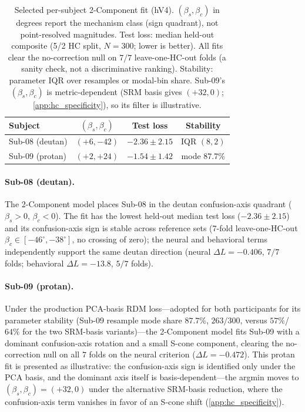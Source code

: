 \documentclass{article}
\begin{document}
\begin{table}[t]
  \caption{Selected per-subject 2-Component fit (hV4). $(\beta_s, \beta_c)$ in degrees report the mechanism class (sign quadrant), not point-resolved magnitudes. Test loss: median held-out composite (5/2 HC split, $N{=}300$; lower is better). All fits clear the no-correction null on $7/7$ leave-one-HC-out folds (a sanity check, not a discriminative ranking). Stability: parameter IQR over resamples or modal-bin share. Sub-09's $(\beta_s, \beta_c)$ is metric-dependent (SRM basis gives $(+32, 0)$; \cref{app:hc_specificity}), so its filter is illustrative.}
  \label{tab:main}
  \begin{center}
    \begin{small}
      \begin{tabular}{lccc}
        \toprule
        Subject & $(\beta_s, \beta_c)$ & Test loss & Stability \\
        \midrule
        Sub-08 (deutan) & $(+6, -42)$ & $-2.36 \pm 2.15$ & IQR $(8,2)$ \\
        Sub-09 (protan) & $(+2, +24)$ & $-1.54 \pm 1.42$ & mode $87.7\%$ \\
        \bottomrule
      \end{tabular}
    \end{small}
  \end{center}
  \vskip -0.15in
\end{table}

\paragraph{Sub-08 (deutan).}
The 2-Component model places Sub-08 in the deutan confusion-axis quadrant ($\beta_s > 0$, $\beta_c < 0$).
The fit has the lowest held-out median test loss ($-2.36 \pm 2.15$) and its confusion-axis sign is stable across reference sets (7-fold leave-one-HC-out $\beta_c \in [-46^\circ, -38^\circ]$, no crossing of zero); the neural and behavioral terms independently support the same deutan direction (neural $\Delta L = -0.406$, $7/7$ folds; behavioral $\Delta L = -13.8$, $5/7$ folds).

\paragraph{Sub-09 (protan).}
Under the production PCA-basis RDM loss---adopted for both participants for its parameter stability (Sub-09 resample mode share $87.7\%$, $263/300$, versus $57\%$/$64\%$ for the two SRM-basis variants)---the 2-Component model fits Sub-09 with a dominant confusion-axis rotation and a small S-cone component, clearing the no-correction null on all $7$ folds on the neural criterion ($\Delta L = -0.472$).
This protan fit is presented as illustrative: the confusion-axis sign is identified only under the PCA basis, and the dominant axis itself is basis-dependent---the argmin moves to $(\beta_s, \beta_c) = (+32, 0)$ under the alternative SRM-basis reduction, where the confusion-axis term vanishes in favor of an S-cone shift (\cref{app:hc_specificity}).
\end{document}
